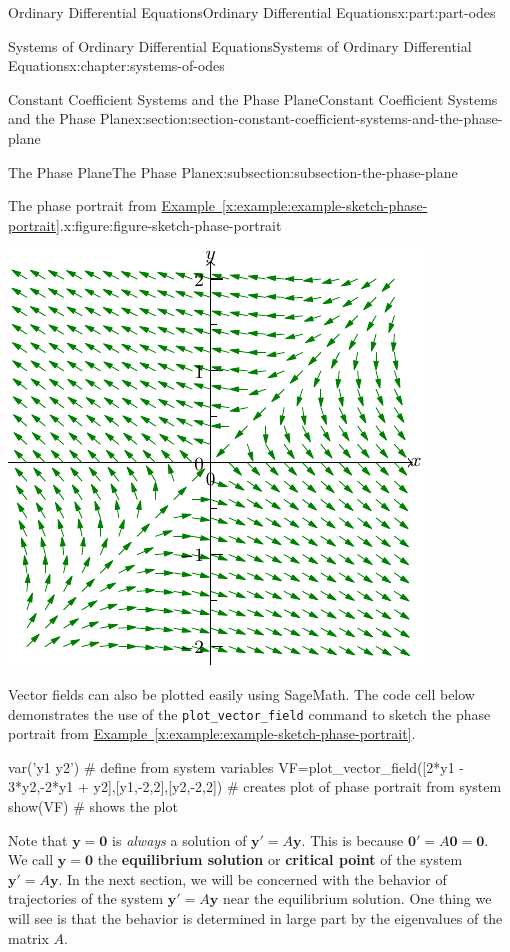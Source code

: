 \documentclass[oneside,10pt,]{book}
\newcommand{\xreffont}{\relax}
\newcommand{\mono}[1]{\texttt{#1}}
\newcommand{\terminology}[1]{\textbf{#1}}
\numberwithin{equation}{part}
\renewcommand{\vec}[1]{\mathbf{#1}}
\begin{document}
\begin{partptx}{Ordinary Differential Equations}{}{Ordinary Differential Equations}{}{}{x:part:part-odes}
\begin{chapterptx}{Systems of Ordinary Differential Equations}{}{Systems of Ordinary Differential Equations}{}{}{x:chapter:systems-of-odes}
\begin{sectionptx}{Constant Coefficient Systems and the Phase Plane}{}{Constant Coefficient Systems and the Phase Plane}{}{}{x:section:section-constant-coefficient-systems-and-the-phase-plane}
\begin{subsectionptx}{The Phase Plane}{}{The Phase Plane}{}{}{x:subsection:subsection-the-phase-plane}
\begin{figureptx}{The phase portrait from \hyperref[x:example:example-sketch-phase-portrait]{Example~{\xreffont\ref{x:example:example-sketch-phase-portrait}}}.}{x:figure:figure-sketch-phase-portrait}{}
\begin{image}{0.25}{0.5}{0.25}
\includegraphics[width=\linewidth]{generated/asymptote/image-15.pdf}
\end{image}%
\tcblower
\end{figureptx}%
Vector fields can also be plotted easily using SageMath. The code cell below demonstrates the use of the \mono{plot\_vector\_field} command to sketch the phase portrait from \hyperref[x:example:example-sketch-phase-portrait]{Example~{\xreffont\ref{x:example:example-sketch-phase-portrait}}}.%
\begin{sageinput}
var('y1 y2') # define from system variables
VF=plot_vector_field([2*y1 - 3*y2,-2*y1 + y2],[y1,-2,2],[y2,-2,2]) # creates plot of phase portrait from system
show(VF) # shows the plot
\end{sageinput}
Note that \(\vec{y}=\vec{0}\) is \emph{always} a solution of \(\vec{y}'=A\vec{y}\). This is because \(\vec{0}'=A\vec{0} = \vec{0}\). We call \(\vec{y} = \vec{0}\) the \terminology{equilibrium solution} or \terminology{critical point} of the system \(\vec{y}'=A\vec{y}\). In the next section, we will be concerned with the behavior of trajectories of the system \(\vec{y}'=A\vec{y}\) near the equilibrium solution. One thing we will see is that the behavior is determined in large part by the eigenvalues of the matrix \(A\).%

\end{subsectionptx}
\end{sectionptx}
\end{chapterptx}
\end{partptx}
\end{document}
